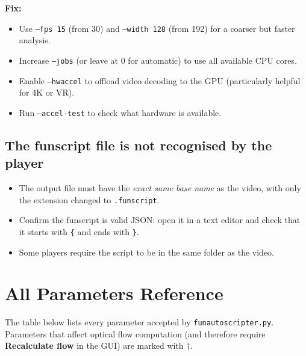 \documentclass[11pt,a4paper]{article}
\newcommand{\code}[1]{\texttt{#1}}
\begin{document}
\textbf{Fix:}
\begin{itemize}[noitemsep]
  \item Use \code{--fps 15} (from 30) and \code{--width 128} (from 192) for a coarser but faster analysis.
  \item Increase \code{--jobs} (or leave at 0 for automatic) to use all available CPU cores.
  \item Enable \code{--hwaccel} to offload video decoding to the GPU (particularly helpful for 4K or VR).
  \item Run \code{--accel-test} to check what hardware is available.
\end{itemize}

\subsection{The funscript file is not recognised by the player}

\begin{itemize}[noitemsep]
  \item The output file must have the \emph{exact same base name} as the video, with only the extension changed to \code{.funscript}.
  \item Confirm the funscript is valid JSON: open it in a text editor and check that it starts with \code{\{} and ends with \code{\}}.
  \item Some players require the script to be in the same folder as the video.
\end{itemize}

\appendix
\renewcommand{\thesection}{Appendix \Alph{section}}
\section{All Parameters Reference}
\label{app:params}

The table below lists every parameter accepted by \code{funautoscripter.py}. Parameters that affect optical flow computation (and therefore require \textbf{Recalculate flow} in the GUI) are marked with $\dagger$.
\end{document}

